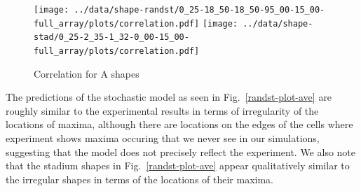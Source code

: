 \documentclass[letterpaper,twocolumn,amsmath,amssymb,pre]{revtex4-1}
\newcommand{\red}[1]{{\bf \color{red} #1}}
\newcommand{\fixme}[1]{\red{[#1]}}
\begin{document}

\begin{figure}
  \texttt{[image: ../data/shape-randst/0\_25-18\_50-18\_50-95\_00-15\_00-full\_array/plots/correlation.pdf]}
  \texttt{[image: ../data/shape-stad/0\_25-2\_35-1\_32-0\_00-15\_00-full\_array/plots/correlation.pdf]}
  \caption{Correlation for A shapes}
  \label{fig:corr-pancake-A}
\end{figure}

The predictions of the stochastic model as seen in
Fig.~\ref{randst-plot-ave} are roughly similar to the experimental
results in terms of irregularity of the locations of maxima, although
there are locations on the edges of the cells where experiment shows
maxima occuring that we never see in our simulations, suggesting that
the model does not precisely reflect the experiment.  We also note
that the stadium shapes in Fig.~\ref{randst-plot-ave} appear
qualitatively similar to the irregular shapes in terms of the
locations of their maxima.
\end{document}
